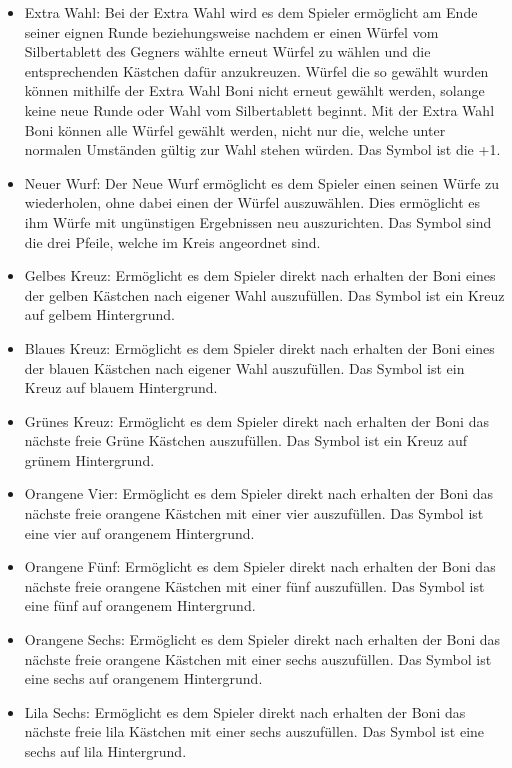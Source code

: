 \begin{itemize}
\item Extra Wahl: Bei der Extra Wahl wird es dem Spieler ermöglicht am Ende seiner eignen Runde beziehungsweise nachdem er einen Würfel vom Silbertablett des Gegners wählte erneut Würfel zu wählen und die entsprechenden Kästchen dafür anzukreuzen. Würfel die so gewählt wurden können mithilfe der Extra Wahl Boni nicht erneut gewählt werden, solange keine neue Runde oder Wahl vom Silbertablett beginnt. Mit der Extra Wahl Boni können alle Würfel gewählt werden, nicht nur die, welche unter normalen Umständen gültig zur Wahl stehen würden. Das Symbol ist die +1.

\item Neuer Wurf: Der Neue Wurf ermöglicht es dem Spieler einen seinen Würfe zu wiederholen, ohne dabei einen der Würfel auszuwählen. Dies ermöglicht es ihm Würfe mit ungünstigen Ergebnissen neu auszurichten. Das Symbol sind die drei Pfeile, welche im Kreis angeordnet sind.

\item Gelbes Kreuz: Ermöglicht es dem Spieler direkt nach erhalten der Boni eines der gelben Kästchen nach eigener Wahl auszufüllen. Das Symbol ist ein Kreuz auf gelbem Hintergrund.

\item Blaues Kreuz: Ermöglicht es dem Spieler direkt nach erhalten der Boni eines der blauen Kästchen nach eigener Wahl auszufüllen. Das Symbol ist ein Kreuz auf blauem Hintergrund.

\item Grünes Kreuz: Ermöglicht es dem Spieler direkt nach erhalten der Boni das nächste freie Grüne Kästchen auszufüllen. Das Symbol ist ein Kreuz auf grünem Hintergrund.

\item Orangene Vier: Ermöglicht es dem Spieler direkt nach erhalten der Boni das nächste freie orangene Kästchen mit einer vier auszufüllen. Das Symbol ist eine vier auf orangenem Hintergrund.

\item Orangene Fünf: Ermöglicht es dem Spieler direkt nach erhalten der Boni das nächste freie orangene Kästchen mit einer fünf auszufüllen. Das Symbol ist eine fünf auf orangenem Hintergrund.

\item Orangene Sechs: Ermöglicht es dem Spieler direkt nach erhalten der Boni das nächste freie orangene Kästchen mit einer sechs auszufüllen. Das Symbol ist eine sechs auf orangenem Hintergrund.

\item Lila Sechs: Ermöglicht es dem Spieler direkt nach erhalten der Boni das nächste freie lila Kästchen mit einer sechs auszufüllen. Das Symbol ist eine sechs auf lila Hintergrund. \\
\end{itemize}

